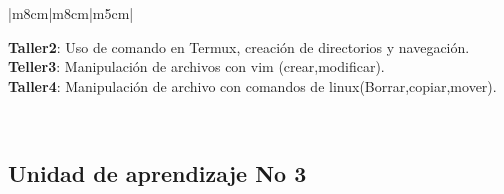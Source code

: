 \documentclass[a4pa<per,12pt,spanish]{article}
\begin{document}
\begin{tabular}[H]{|m{8cm}|m{8cm}|m{5cm}|}
\begin{minipage}[H]{1.0\linewidth}
    \textbf{Taller2}: Uso de comando en Termux, creación de directorios y navegación.\\
    
  \noindent  \textbf{Teller3}: Manipulación de archivos con vim (crear,modificar).\\
    
    \textbf{Taller4}: Manipulación de archivo con comandos de linux(Borrar,copiar,mover).\\
  \end{minipage}

  \\ \hline
  
\end{tabular}


\newpage
\subsection{Unidad de aprendizaje No 3}
\label{sec:unid-de-aprend3}
\end{document}

